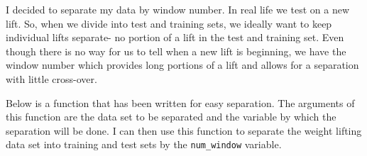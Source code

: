 \documentclass[12pt,twoside]{reedthesis}
\begin{document}
  I decided to separate my data by window number. In real life we test on
  a new lift. So, when we divide into test and training sets, we ideally
  want to keep individual lifts separate- no portion of a lift in the test
  and training set. Even though there is no way for us to tell when a new
  lift is beginning, we have the window number which provides long
  portions of a lift and allows for a separation with little cross-over.
  
  \newpage
  
  Below is a function that has been written for easy separation. The
  arguments of this function are the data set to be separated and the
  variable by which the separation will be done. I can then use this
  function to separate the weight lifting data set into training and test
  sets by the \texttt{num\_window} variable.
  
\end{document}
